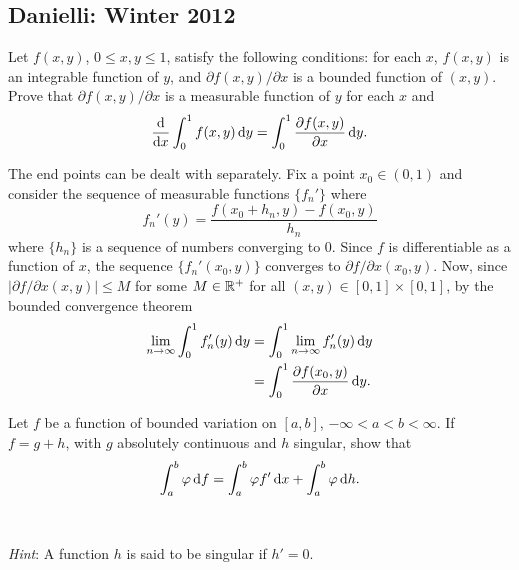 \subsection{Danielli: Winter 2012}
\setcounter{exercise}{0}
\setcounter{equation}{0}

\begin{problem}
  Let \(f(x,y)\), \(0\leq x,y\leq 1\), satisfy the following conditions:
  for each \(x\), \(f(x,y)\) is an integrable function of \(y\), and
  \(\partial f(x,y)/\partial x\) is a bounded function of \((x,y)\). Prove
  that \(\partial f(x,y)/\partial x\) is a measurable function of \(y\) for
  each \(x\) and
  \[
    \frac{\mathrm{d}}{\mathrm{d} x}\int_0^1f(x,y)\mathop{}\!\mathrm{d} y= \int_0^1\frac{\partial
      f(x,y)}{\partial x}\mathop{}\!\mathrm{d} y.
  \]
\end{problem}
\begin{solution}
  The end points can be dealt with separately. Fix a point \(x_0\in(0,1)\)
  and consider the sequence of measurable functions \(\{f_n'\}\) where
  \[
    f_n'(y)=\frac{f(x_0+h_n,y)-f(x_0,y)}{h_n}
  \]
  where \(\{h_n\}\) is a sequence of numbers converging to \(0\). Since
  \(f\) is differentiable as a function of \(x\), the sequence
  \(\{f_n'(x_0,y)\}\) converges to \(\partial f/\partial x(x_0,y)\). Now,
  since \(|\partial f/\partial x(x,y)|\leq M\) for some \(M\in\mathbb{R}^+\) for
  all \((x,y)\in[0,1]\times[0,1]\), by the bounded convergence theorem
  \begin{gather}
    \label{eq:jan-12:bounded-conv-est}
    \begin{aligned}
      \lim_{n\to\infty}\int_0^1 f'_n(y)\mathop{}\!\mathrm{d} y
      &=\int_0^1\lim_{n\to\infty} f'_n(y)\mathop{}\!\mathrm{d} y\\
      &=\int_0^1 \frac{\partial f(x_0,y)}{\partial x}\mathop{}\!\mathrm{d} y.
    \end{aligned}
  \end{gather}
\end{solution}

\begin{problem}
  Let \(f\) be a function of bounded variation on \([a,b]\),
  \(-\infty<a<b<\infty\). If \(f=g+h\), with \(g\) absolutely continuous
  and \(h\) singular, show that
  \[
    \int_a^b\varphi\mathop{}\!\mathrm{d} f=\int_a^b\varphi f'\mathop{}\!\mathrm{d} x+\int_a^b\varphi\mathop{}\!\mathrm{d}
    h.
  \]
  \\\\
  \emph{Hint}: A function \(h\) is said to be singular if \(h'=0\).
\end{problem}
\begin{solution}
\end{solution}

